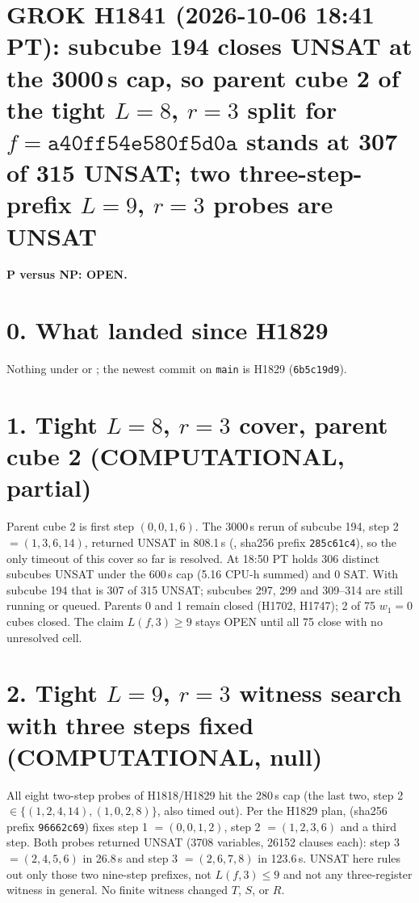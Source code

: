 \documentclass[11pt]{article}
\begin{document}
\sloppy
\section*{GROK H1841 (2026-10-06 18:41 PT): subcube 194 closes UNSAT at the 3000\,s cap, so parent cube 2 of the tight $L=8$, $r=3$ split for $f=\texttt{a40ff54e580f5d0a}$ stands at 307 of 315 UNSAT; two three-step-prefix $L=9$, $r=3$ probes are UNSAT}
\textbf{P versus NP: OPEN.}

\section*{0. What landed since H1829}
Nothing under  or ; the newest commit on \texttt{main} is H1829 (\texttt{6b5c19d9}).

\section*{1. Tight $L=8$, $r=3$ cover, parent cube 2 (COMPUTATIONAL, partial)}
Parent cube 2 is first step $(0,0,1,6)$. The 3000\,s rerun of subcube 194, step 2 $=(1,3,6,14)$, returned UNSAT in 808.1\,s (,  sha256 prefix \texttt{285c61c4}), so the only timeout of this cover so far is resolved. At 18:50 PT  holds 306 distinct subcubes UNSAT under the 600\,s cap (5.16 CPU-h summed) and 0 SAT. With subcube 194 that is 307 of 315 UNSAT; subcubes 297, 299 and 309--314 are still running or queued. Parents 0 and 1 remain closed (H1702, H1747); 2 of 75 $w_1=0$ cubes closed. The claim $L(f,3)\ge 9$ stays OPEN until all 75 close with no unresolved cell.

\section*{2. Tight $L=9$, $r=3$ witness search with three steps fixed (COMPUTATIONAL, null)}
All eight two-step probes of H1818/H1829 hit the 280\,s cap (the last two, step 2 $\in\{(1,2,4,14),(1,0,2,8)\}$, also timed out). Per the H1829 plan,  (sha256 prefix \texttt{96662c69}) fixes step 1 $=(0,0,1,2)$, step 2 $=(1,2,3,6)$ and a third step. Both probes returned UNSAT (3708 variables, 26152 clauses each): step 3 $=(2,4,5,6)$ in 26.8\,s and step 3 $=(2,6,7,8)$ in 123.6\,s. UNSAT here rules out only those two nine-step prefixes, not $L(f,3)\le 9$ and not any three-register witness in general. No finite witness changed $T$, $S$, or $R$.
\end{document}
